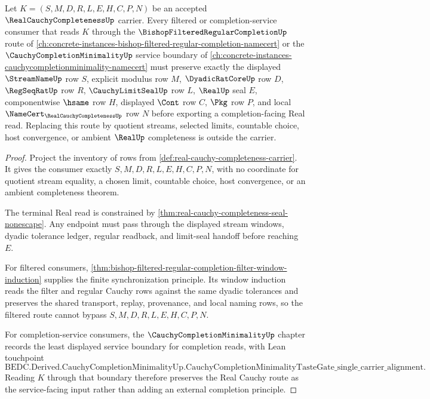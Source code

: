\begin{theorem}
\label{thm:real-cauchy-completeness-filtered-minimality}
Let $K=(S,M,D,R,L,E,H,C,P,N)$ be an accepted $\RealCauchyCompletenessUp$ carrier. Every filtered or completion-service consumer that reads $K$ through the $\BishopFilteredRegularCompletionUp$ route of \autoref{ch:concrete-instances-bishop-filtered-regular-completion-namecert} or the $\CauchyCompletionMinimalityUp$ service boundary of \autoref{ch:concrete-instances-cauchycompletionminimality-namecert} must preserve exactly the displayed $\StreamNameUp$ row $S$, explicit modulus row $M$, $\DyadicRatCoreUp$ row $D$, $\RegSeqRatUp$ row $R$, $\CauchyLimitSealUp$ row $L$, $\RealUp$ seal $E$, componentwise $\hsame$ row $H$, displayed $\Cont$ row $C$, $\Pkg$ row $P$, and local $\NameCert_{\RealCauchyCompletenessUp}$ row $N$ before exporting a completion-facing Real read. Replacing this route by quotient streams, selected limits, countable choice, host convergence, or ambient $\RealUp$ completeness is outside the carrier.
\end{theorem}
\begin{proof}
Project the inventory of rows from \autoref{def:real-cauchy-completeness-carrier}. It gives the consumer exactly $S,M,D,R,L,E,H,C,P,N$, with no coordinate for quotient stream equality, a chosen limit, countable choice, host convergence, or an ambient completeness theorem.

The terminal Real read is constrained by \autoref{thm:real-cauchy-completeness-seal-nonescape}. Any endpoint must pass through the displayed stream windows, dyadic tolerance ledger, regular readback, and limit-seal handoff before reaching $E$.

For filtered consumers, \autoref{thm:bishop-filtered-regular-completion-filter-window-induction} supplies the finite synchronization principle. Its window induction reads the filter and regular Cauchy rows against the same dyadic tolerances and preserves the shared transport, replay, provenance, and local naming rows, so the filtered route cannot bypass $S,M,D,R,L,E,H,C,P,N$.

For completion-service consumers, the $\CauchyCompletionMinimalityUp$ chapter records the least displayed service boundary for completion reads, with Lean touchpoint
$$
\mathrm{BEDC.Derived.CauchyCompletionMinimalityUp.CauchyCompletionMinimalityTasteGate\_single\_carrier\_alignment}.
$$
Reading $K$ through that boundary therefore preserves the Real Cauchy route as the service-facing input rather than adding an external completion principle.
\end{proof}

